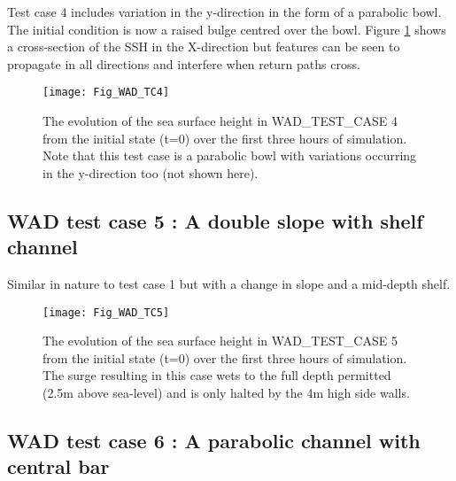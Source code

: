 Test case 4 includes variation in the y-direction in the form of a parabolic bowl. The
initial condition is now a raised bulge centred over the bowl. Figure \ref{Fig_WAD_TC4}
shows a cross-section of the SSH in the X-direction but features can be seen to propagate
in all directions and interfere when return paths cross.


\begin{figure}[htb] \begin{center}
\texttt{[image: Fig\_WAD\_TC4]}
\caption{ \label{Fig_WAD_TC4}
The evolution of the sea surface height in WAD\_TEST\_CASE 4 from the initial state (t=0)
over the first three hours of simulation. Note that this test case is a parabolic bowl with
variations occurring in the y-direction too (not shown here).}
\end{center}\end{figure}

\clearpage
\subsection [WAD test case 5 : A double slope with shelf channel ]
                    {WAD test case 5 : A double slope with shelf channel}
\label{WAD_test_case5}

Similar in nature to test case 1 but with a change in slope and a mid-depth shelf.


\begin{figure}[htb] \begin{center}
\texttt{[image: Fig\_WAD\_TC5]}
\caption{ \label{Fig_WAD_TC5}
The evolution of the sea surface height in WAD\_TEST\_CASE 5 from the initial state (t=0)
over the first three hours of simulation. The surge resulting in this case wets to the full 
depth permitted (2.5m above sea-level) and is only halted by the 4m high side walls.}
\end{center}\end{figure}

\clearpage
\subsection [WAD test case 6 : A parabolic channel with central bar ]
                    {WAD test case 6 : A parabolic channel with central bar}
\label{WAD_test_case6}

